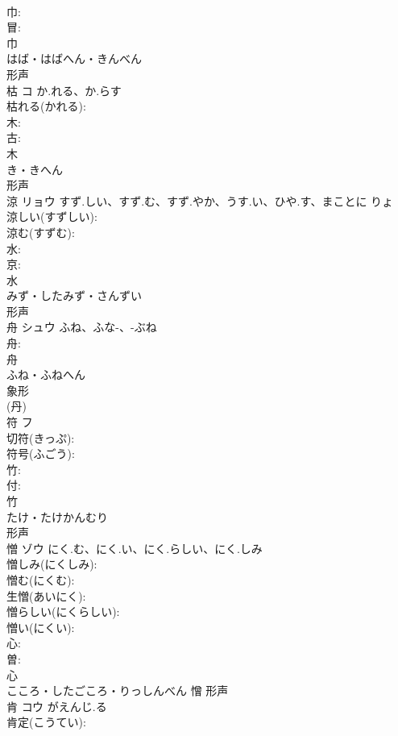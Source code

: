 \documentclass[8pt]{extreport}
\begin{document}
\begin{CJK}{UTF8}{min}
\\	巾: 
\\	冒: 
\\	巾	
\\	はば・はばへん・きんべん	
\\	形声 
\\	枯	コ	か.れる、か.らす		
\\	枯れる(かれる): 
\\	木: 
\\	古: 
\\	木	
\\	き・きへん	
\\	形声 
\\	涼	リョウ	すず.しい、すず.む、すず.やか、うす.い、ひや.す、まことに	りょ	
\\	涼しい(すずしい): 
\\	涼む(すずむ): 
\\	水: 
\\	京: 
\\	水	
\\	みず・したみず・さんずい	
\\	形声 
\\	舟	シュウ	ふね、ふな-、-ぶね		
\\	舟: 
\\	舟	
\\	ふね・ふねへん	
\\	象形 
\\	(丹) 
\\	符	フ			
\\	切符(きっぷ): 
\\	符号(ふごう): 
\\	竹: 
\\	付: 
\\	竹	
\\	たけ・たけかんむり	
\\	形声 
\\	憎	ゾウ	にく.む、にく.い、にく.らしい、にく.しみ		
\\	憎しみ(にくしみ): 
\\	憎む(にくむ): 
\\	生憎(あいにく): 
\\	憎らしい(にくらしい): 
\\	憎い(にくい): 
\\	心: 
\\	曽: 
\\	心	
\\	こころ・したごころ・りっしんべん	憎	形声 
\\	肯	コウ	がえんじ.る		
\\	肯定(こうてい): 

\end{CJK}
\end{document}
